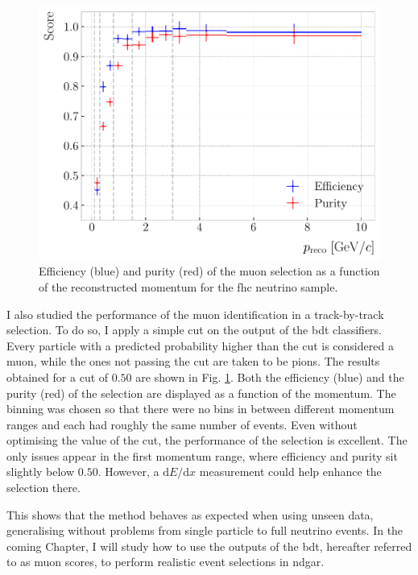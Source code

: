 \begin{figure}[t]
	\centering
	\includegraphics[width=.75\linewidth]{Images/GArSoft_PID/BDT/ecal_bdt_validation_momentum.pdf}
	\caption[Efficiency and purity of the muon selection as a function of the reconstructed momentum for the \gls{fhc} neutrino sample.]{Efficiency (blue) and purity (red) of the muon selection as a function of the reconstructed momentum for the \gls{fhc} neutrino sample.}
	\label{fig:bdt_validation_output}
\end{figure}

I also studied the performance of the muon identification in a track-by-track selection. To do so, I apply a simple cut on the output of the \gls{bdt} classifiers. Every particle with a predicted probability higher than the cut is considered a muon, while the ones not passing the cut are taken to be pions. The results obtained for a cut of $0.50$ are shown in Fig. \ref{fig:bdt_validation_output}. Both the efficiency (blue) and the purity (red) of the selection are displayed as a function of the momentum. The binning was chosen so that there were no bins in between different momentum ranges and each had roughly the same number of events. Even without optimising the value of the cut, the performance of the selection is excellent. The only issues appear in the first momentum range, where efficiency and purity sit slightly below $0.50$. However, a $\mathrm{d}E/\mathrm{d}x$ measurement could help enhance the selection there.

This shows that the method behaves as expected when using unseen data, generalising without problems from single particle to full neutrino events. In the coming Chapter, I will study how to use the outputs of the \gls{bdt}, hereafter referred to as muon scores, to perform realistic event selections in \gls{ndgar}.

